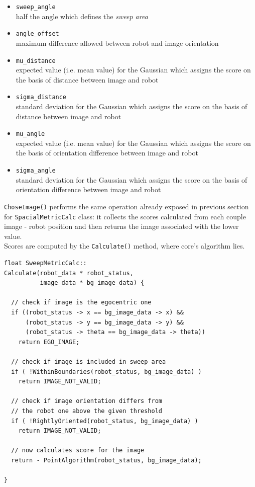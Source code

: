 \begin{itemize}
  \item \texttt{sweep\_angle} \\
    half the angle which defines the \textit{sweep area}
  \item \texttt{angle\_offset} \\
    maximum difference allowed between robot and 
    image orientation 
  \item \texttt{mu\_distance} \\
    expected value (i.e. mean value) for the Gaussian 
    which assigns the score on the basis of distance between
    image and robot
  \item \texttt{sigma\_distance} \\
    standard deviation for the Gaussian which assigns the 
    score on the basis of distance between image and robot
  \item \texttt{mu\_angle} \\
    expected value (i.e. mean value) for the Gaussian which 
    assigns the score on the basis of orientation difference
    between image and robot
  \item \texttt{sigma\_angle} \\
    standard deviation for the Gaussian which assigns the 
    score on the basis of orientation difference between image
    and robot
\end{itemize}

\texttt{ChoseImage()} performs the same operation already
exposed in previous section for \texttt{SpacialMetricCalc}
class: it collects the scores calculated from each couple image -
robot position and then returns the image associated with
the lower value.
\\
Scores are computed by the \texttt{Calculate()}
method, where core's algorithm lies.
\\
\begin{lstlisting}[caption={\texttt{SweepMetricCalc::Calculate} method},
    label={code:sweepmetriccalc:calculate}]
float SweepMetricCalc::
Calculate(robot_data * robot_status,
          image_data * bg_image_data) {
  
  // check if image is the egocentric one 
  if ((robot_status -> x == bg_image_data -> x) &&
      (robot_status -> y == bg_image_data -> y) &&
      (robot_status -> theta == bg_image_data -> theta))
    return EGO_IMAGE;

  // check if image is included in sweep area
  if ( !WithinBoundaries(robot_status, bg_image_data) )
    return IMAGE_NOT_VALID;
  
  // check if image orientation differs from
  // the robot one above the given threshold
  if ( !RightlyOriented(robot_status, bg_image_data) )
    return IMAGE_NOT_VALID;
  
  // now calculates score for the image
  return - PointAlgorithm(robot_status, bg_image_data);

}
\end{lstlisting}

